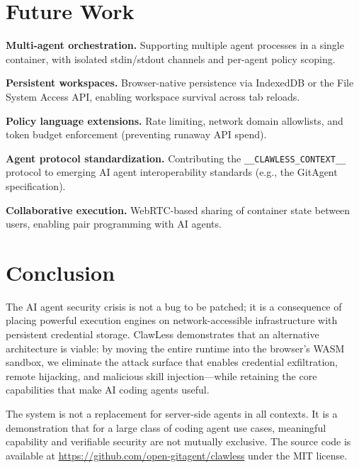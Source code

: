 \documentclass[11pt,twocolumn]{article}
\begin{document}
\section{Future Work}
\label{sec:future}

\textbf{Multi-agent orchestration.} Supporting multiple agent processes in a single container, with isolated stdin/stdout channels and per-agent policy scoping.

\textbf{Persistent workspaces.} Browser-native persistence via IndexedDB or the File System Access API, enabling workspace survival across tab reloads.

\textbf{Policy language extensions.} Rate limiting, network domain allowlists, and token budget enforcement (preventing runaway API spend).

\textbf{Agent protocol standardization.} Contributing the \texttt{\_\_CLAWLESS\_CONTEXT\_\_} protocol to emerging AI agent interoperability standards (e.g., the GitAgent specification).

\textbf{Collaborative execution.} WebRTC-based sharing of container state between users, enabling pair programming with AI agents.

\section{Conclusion}
\label{sec:conclusion}

The AI agent security crisis is not a bug to be patched; it is a consequence of placing powerful execution engines on network-accessible infrastructure with persistent credential storage. ClawLess demonstrates that an alternative architecture is viable: by moving the entire runtime into the browser's WASM sandbox, we eliminate the attack surface that enables credential exfiltration, remote hijacking, and malicious skill injection---while retaining the core capabilities that make AI coding agents useful.

The system is not a replacement for server-side agents in all contexts. It is a demonstration that for a large class of coding agent use cases, meaningful capability and verifiable security are not mutually exclusive. The source code is available at \url{https://github.com/open-gitagent/clawless} under the MIT license.
\end{document}
